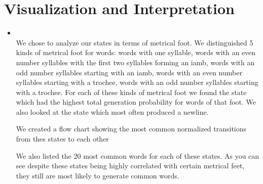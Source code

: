 \section{Visualization and Interpretation}
\medskip
\begin{itemize}


    \item {} \\

    We chose to analyze our states in terms of metrical foot. We distinguished 5 kinds of metrical foot for words: words with one syllable,
    words with an even number syllables with the first two syllables forming an iamb,
    words with an odd number syllables starting with an iamb,
    words with an even number syllables starting with a trochee,
    words with an odd number syllables starting with a trochee. For each of these kinds of metrical foot we found the state which had the highest total generation probability for words of that foot. We also looked at the state which most often produced a newline.

    We created a flow chart showing the most common normalized transitions from thes states to each other

    We also listed the 20 most common words for each of these states. As you can see despite these states being highly correlated with certain metrical feet, they still are most likely to generate common words.


\end{itemize}
